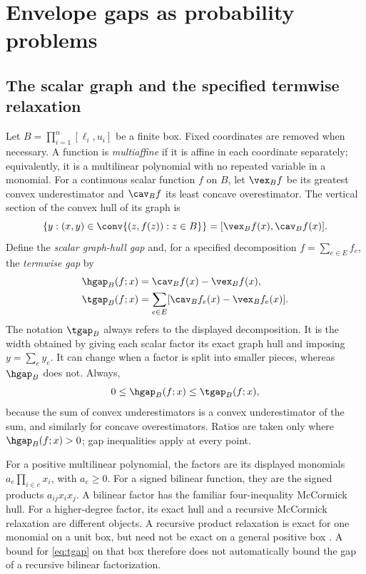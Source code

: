 \section{Envelope gaps as probability problems}\label{sec:foundations}
\subsection{The scalar graph and the specified termwise relaxation}
Let $B=\prod_{i=1}^n[\ell_i,u_i]$ be a finite box. Fixed coordinates are
removed when necessary. A function is \emph{multiaffine} if it is affine in
each coordinate separately; equivalently, it is a multilinear polynomial
with no repeated variable in a monomial. For a continuous scalar function
$f$ on $B$, let $\vex_B f$ be its greatest convex underestimator and
$\cav_B f$ its least concave overestimator. The vertical section of the
convex hull of its graph is
\[
 \{y:(x,y)\in\conv\{(z,f(z)):z\in B\}\}
 =[\vex_B f(x),\cav_B f(x)].
\]
Define the \emph{scalar graph-hull gap} and, for a specified decomposition
$f=\sum_{e\in E}f_e$, the \emph{termwise gap} by
\begin{align}
 \hgap_B(f;x)&=\cav_B f(x)-\vex_B f(x),\label{eq:hgap}\\
 \tgap_B(f;x)&=\sum_{e\in E}
 [\cav_B f_e(x)-\vex_B f_e(x)].\label{eq:tgap}
\end{align}
The notation $\tgap_B$ always refers to the displayed decomposition.
It is the width obtained by giving each scalar factor its exact graph hull
and imposing $y=\sum_e y_e$. It can change when a factor is split into
smaller pieces, whereas $\hgap_B$ does not. Always,
\begin{equation}\label{eq:gap-order}
 0\le\hgap_B(f;x)\le\tgap_B(f;x),
\end{equation}
because the sum of convex underestimators is a convex underestimator of
the sum, and similarly for concave overestimators. Ratios are taken only
where $\hgap_B(f;x)>0$; gap inequalities apply at every point.

For a positive multilinear polynomial, the factors are its displayed
monomials $a_e\prod_{i\in e}x_i$, with $a_e\ge0$. For a signed bilinear
function, they are the signed products $a_{ij}x_ix_j$. A bilinear factor
has the familiar four-inequality McCormick hull. For a higher-degree factor,
its exact hull and a recursive McCormick relaxation are different objects.
A recursive product relaxation is exact for one monomial on a unit box,
but need not be exact on a general positive box
\citep[Sections 2--3]{Luedtke2012}. A bound for \eqref{eq:tgap} on that
box therefore does not automatically bound the gap of a recursive bilinear
factorization.

